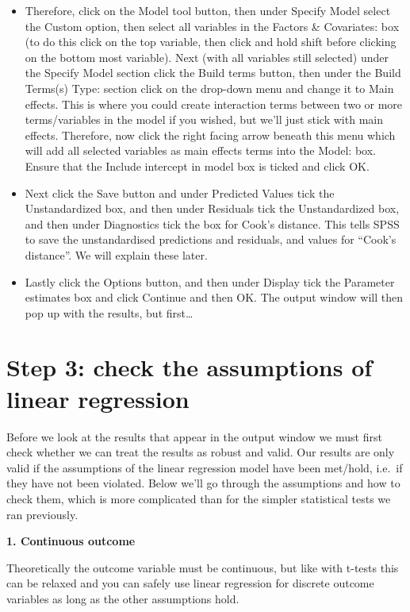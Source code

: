 \documentclass[
]{book}
\begin{document}
\begin{itemize}
\item
  Therefore, click on the Model tool button, then under Specify Model select the Custom option, then select all variables in the Factors \& Covariates: box (to do this click on the top variable, then click and hold shift before clicking on the bottom most variable). Next (with all variables still selected) under the Specify Model section click the Build terms button, then under the Build Terms(s) Type: section click on the drop-down menu and change it to Main effects. This is where you could create interaction terms between two or more terms/variables in the model if you wished, but we'll just stick with main effects. Therefore, now click the right facing arrow beneath this menu which will add all selected variables as main effects terms into the Model: box. Ensure that the Include intercept in model box is ticked and click OK.
\item
  Next click the Save button and under Predicted Values tick the Unstandardized box, and then under Residuals tick the Unstandardized box, and then under Diagnostics tick the box for Cook's distance. This tells SPSS to save the unstandardised predictions and residuals, and values for ``Cook's distance''. We will explain these later.
\item
  Lastly click the Options button, and then under Display tick the Parameter estimates box and click Continue and then OK. The output window will then pop up with the results, but first\ldots{}
\end{itemize}

\hypertarget{step-3-check-the-assumptions-of-linear-regression}{%
\section{Step 3: check the assumptions of linear regression}\label{step-3-check-the-assumptions-of-linear-regression}}

Before we look at the results that appear in the output window we must first check whether we can treat the results as robust and valid. Our results are only valid if the assumptions of the linear regression model have been met/hold, i.e.~if they have not been violated. Below we'll go through the assumptions and how to check them, which is more complicated than for the simpler statistical tests we ran previously.

\textbf{1. Continuous outcome}

Theoretically the outcome variable must be continuous, but like with t-tests this can be relaxed and you can safely use linear regression for discrete outcome variables as long as the other assumptions hold.
\end{document}
